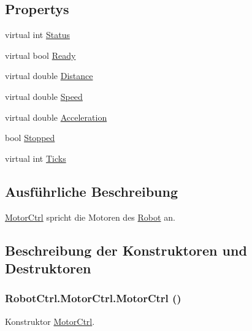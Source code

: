 \subsection*{Propertys}
\begin{DoxyCompactItemize}
\item 
virtual int \hyperlink{class_robot_ctrl_1_1_motor_ctrl_ac0f2ebafce89738ca669eaa920a30c80}{Status}
\item 
virtual bool \hyperlink{class_robot_ctrl_1_1_motor_ctrl_a1152904081a4c96fa0bf27a6a48e728d}{Ready}
\item 
virtual double \hyperlink{class_robot_ctrl_1_1_motor_ctrl_a7f1b09f359e4e09c85c9438a5de7dd9b}{Distance}
\item 
virtual double \hyperlink{class_robot_ctrl_1_1_motor_ctrl_a13a5a1ee7896d0557c58ba617af60029}{Speed}
\item 
virtual double \hyperlink{class_robot_ctrl_1_1_motor_ctrl_a57bbec274a01f59d5e5ede7599e0ca9f}{Acceleration}
\item 
bool \hyperlink{class_robot_ctrl_1_1_motor_ctrl_a5d2599ad295ece36d107cc7cb117d9c9}{Stopped}
\item 
virtual int \hyperlink{class_robot_ctrl_1_1_motor_ctrl_a625a8335b71115e58d2d04c59027fb81}{Ticks}
\end{DoxyCompactItemize}


\subsection{Ausführliche Beschreibung}
\hyperlink{class_robot_ctrl_1_1_motor_ctrl}{MotorCtrl} spricht die Motoren des \hyperlink{class_robot_ctrl_1_1_robot}{Robot} an. 

\subsection{Beschreibung der Konstruktoren und Destruktoren}
\hypertarget{class_robot_ctrl_1_1_motor_ctrl_aa8a23abe3b652807ebf31107274fbe00}{
\subsubsection[{MotorCtrl}]{\setlength{\rightskip}{0pt plus 5cm}RobotCtrl.MotorCtrl.MotorCtrl ()}}
\label{class_robot_ctrl_1_1_motor_ctrl_aa8a23abe3b652807ebf31107274fbe00}
Konstruktor \hyperlink{class_robot_ctrl_1_1_motor_ctrl}{MotorCtrl}. 


